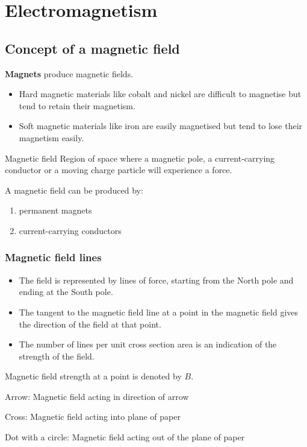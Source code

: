 \section{Electromagnetism}
\subsection{Concept of a magnetic field}
\textbf{Magnets} produce magnetic fields. 
\begin{itemize}
\item Hard magnetic materials like cobalt and nickel are difficult to magnetise but tend to retain their magnetism.
\item Soft magnetic materials like iron are easily magnetised but tend to lose their magnetism easily.
\end{itemize}

\begin{defn}{Magnetic field}{}
Region of space where a magnetic pole, a current-carrying conductor or a moving charge particle will experience a force.
\end{defn}

A magnetic field can be produced by:
\begin{enumerate}
\item permanent magnets
\item current-carrying conductors
\end{enumerate}

\subsubsection{Magnetic field lines}
\begin{itemize}
\item The field is represented by lines of force, starting from the North pole and ending at the South pole.
\item The tangent to the magnetic field line at a point in the magnetic field gives the direction of the field at that point.
\item The number of lines per unit cross section area is an indication of the strength of the field.
\end{itemize}

Magnetic field strength at a point is denoted by $B$.

Arrow: Magnetic field acting in direction of arrow

Cross: Magnetic field acting into plane of paper

Dot with a circle: Magnetic field acting out of the plane of paper

